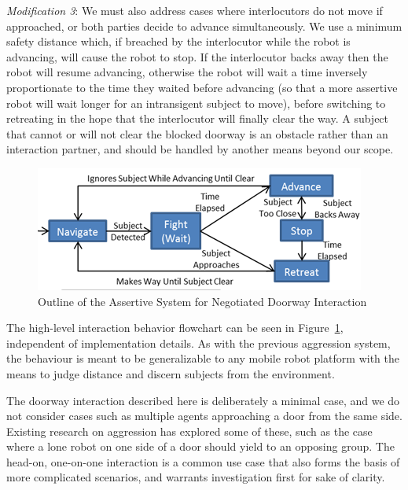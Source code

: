 \documentclass[letterpaper, 10 pt, conference]{ieeeconf}  %
\begin{document}
\textit{Modification 3}: We must also address cases where interlocutors do not move if approached, or both parties decide to advance simultaneously. We use a minimum safety distance which, if breached by the interlocutor while the robot is advancing, will cause the robot to stop. If the interlocutor backs away then the robot will resume advancing, otherwise the robot will wait a time inversely proportionate to the time they waited before advancing (so that a more assertive robot will wait longer for an intransigent subject to move), before switching to retreating in the hope that the interlocutor will finally clear the way. A subject that cannot or will not clear the blocked doorway is an obstacle rather than an interaction partner, and should be handled by another means beyond our scope. 
 
    \begin{figure}
      \centering
      \includegraphics{assertive_behavior.png}
      \caption{Outline of the Assertive System for Negotiated Doorway Interaction}
      \label{fig:Assertive}
   \end{figure}


The high-level interaction behavior flowchart can be seen in Figure~\ref{fig:Assertive}, independent of implementation details. As with the previous aggression system, the behaviour is meant to be generalizable to any mobile robot platform with the means to judge distance and discern subjects from the environment. 


The doorway interaction described here is deliberately a minimal case, and we do not consider cases such as multiple agents approaching a door from the same side. Existing research on aggression has explored some of these, such as the case where a lone robot on one side of a door should yield to an opposing group\cite{zhang2006icra}. The head-on, one-on-one interaction is a common use case that also forms the basis of more complicated scenarios, and warrants investigation first for sake of clarity.
\end{document}

